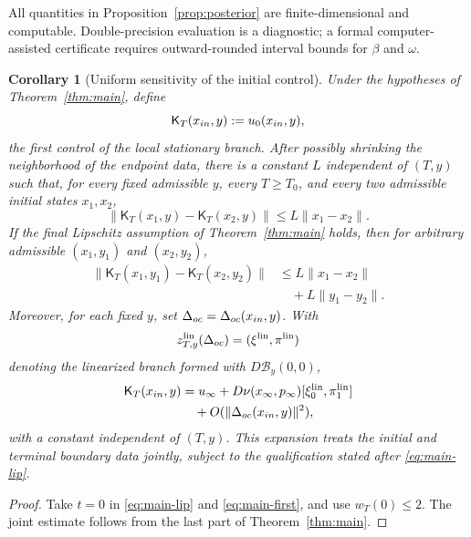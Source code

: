 \documentclass[twocolumn,nameyear,amsthm]{autart}
\newcommand{\Kfb}{\mathsf K}
\newcommand{\B}{\mathcal B}
\newcommand{\lin}{\mathrm{lin}}
\newcommand{\xinf}{x_\infty}
\newcommand{\uinf}{u_\infty}
\newcommand{\pinf}{p_\infty}
\numberwithin{equation}{section}
\newtheorem{corollary}[theorem]{Corollary}
\begin{document}
All quantities in Proposition~\ref{prop:posterior} are finite-dimensional and
computable.  Double-precision evaluation is a diagnostic; a formal
computer-assisted certificate requires outward-rounded interval bounds for
$\beta$ and $\omega$.

\begin{corollary}[Uniform sensitivity of the initial control]\label{cor:feedback}
Under the hypotheses of Theorem~\ref{thm:main}, define
\[
   \Kfb_T(x_{\rm in},y):=u_0(x_{\rm in},y),
\]
the first control of the local stationary branch.  After possibly shrinking
the neighborhood of the endpoint data, there is a constant $L$ independent of
$(T,y)$ such that, for every fixed admissible $y$, every $T\ge T_0$, and every
two admissible initial states $x_1,x_2$,
\[
   \|\Kfb_T(x_1,y)-\Kfb_T(x_2,y)\|
   \le L\|x_1-x_2\|.
\]
If the final Lipschitz assumption of Theorem~\ref{thm:main} holds, then
for arbitrary admissible $(x_1,y_1)$ and $(x_2,y_2)$,
\[
\begin{aligned}
 \|\Kfb_T(x_1,y_1)-\Kfb_T(x_2,y_2)\|
 &\le L\|x_1-x_2\|\\
 &\quad{}+L\|y_1-y_2\|.
\end{aligned}
\]
Moreover, for each fixed $y$, set
$\Delta_{\rm oc}=\Delta_{\rm oc}(x_{\rm in},y)$.  With
\[
 z^{\lin}_{T,y}(\Delta_{\rm oc})
 =(\xi^{\lin},\pi^{\lin})
\]
denoting the linearized branch formed with $D\B_y(0,0)$,
\[
\begin{aligned}
   \Kfb_T(x_{\rm in},y)
   &=\uinf+
     D\nu(\xinf,\pinf)
     [\xi_0^{\lin},\pi_1^{\lin}]\\
   &\quad{}+O(\|\Delta_{\rm oc}(x_{\rm in},y)\|^2),
\end{aligned}
\]
with a constant independent of $(T,y)$.  This expansion treats the initial and
terminal boundary data jointly, subject to the qualification stated after
\eqref{eq:main-lip}.
\end{corollary}
\begin{proof}
Take $t=0$ in \eqref{eq:main-lip} and \eqref{eq:main-first}, and use
$w_T(0)\le2$.  The joint estimate follows from the last part of
Theorem~\ref{thm:main}.
\end{proof}
\end{document}
